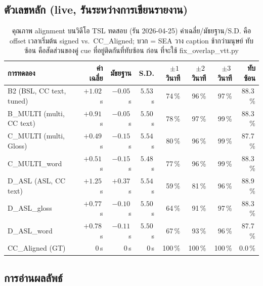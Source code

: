 \documentclass[11pt,a4paper]{article}
\def\texttt#1{#1}%
\def\textbf#1{#1}%
\def\textit#1{#1}%
\def\emph#1{#1}%
\begin{document}
\subsection{ตัวเลขหลัก (live, รันระหว่างการเขียนรายงาน)}
\label{sec:live-numbers}

\begin{table}[h]
\centering
\small
\renewcommand{\arraystretch}{1.1}
\begin{tabular}{lrrrrrrr}
\toprule
\textbf{การทดลอง} & \textbf{ค่าเฉลี่ย} & \textbf{มัธยฐาน} & \textbf{S.D.} &
\textbf{$\pm 1$\,วินาที} & \textbf{$\pm 2$\,วินาที} & \textbf{$\pm 3$\,วินาที} & \textbf{ทับซ้อน} \\
\midrule
B2   (BSL, CC text, tuned)       & $+1.02$\,s & $-0.05$\,s & $5.53$\,s & 74\,\% & 96\,\% & 97\,\% & 88.3\,\% \\
B\_MULTI (multi, CC text)        & $+0.91$\,s & $-0.05$\,s & $5.50$\,s & 78\,\% & \textbf{97\,\%} & \textbf{99\,\%} & 88.3\,\% \\
\textbf{C\_MULTI} (multi, Gloss) & \textbf{$+0.49$\,s} & \textbf{$-0.15$\,s} & $5.54$\,s & \textbf{80\,\%} & 96\,\% & \textbf{99\,\%} & \textbf{87.7\,\%} \\
C\_MULTI\_word                   & $+0.51$\,s & $-0.15$\,s & $5.48$\,s & 77\,\% & 96\,\% & 99\,\% & 88.3\,\% \\
D\_ASL  (ASL, CC text)           & $+1.25$\,s & $+0.37$\,s & $5.54$\,s & 59\,\% & 81\,\% & 96\,\% & 88.9\,\% \\
D\_ASL\_gloss                    & $+0.77$\,s & $-0.10$\,s & $5.50$\,s & 64\,\% & 91\,\% & 97\,\% & 88.3\,\% \\
D\_ASL\_word                     & $+0.78$\,s & $-0.11$\,s & $5.50$\,s & 67\,\% & 93\,\% & 96\,\% & 87.7\,\% \\
\midrule
\textit{CC\_Aligned} (GT)        & $0$\,s & $0$\,s & $0$\,s & 100\,\% & 100\,\% & 100\,\% & \textbf{0.0\,\%} \\
\bottomrule
\end{tabular}
\caption{\textbf{คุณภาพ alignment บนวิดีโอ TSL ทดสอบ} (รัน 2026-04-25)
\texttt{ค่าเฉลี่ย/มัธยฐาน/S.D.} คือ offset เวลาเริ่มต้น signed vs.\ \texttt{CC\_Aligned};
บวก = SEA วาง caption ช้ากว่ามนุษย์
\texttt{ทับซ้อน} คือสัดส่วนของคู่ cue ที่อยู่ติดกันที่ทับซ้อน
\emph{ก่อน} ที่จะใช้ \texttt{fix\_overlap\_vtt.py}}
\label{tab:results-tsl}
\end{table}

\subsection{การอ่านผลลัพธ์}
\end{document}
